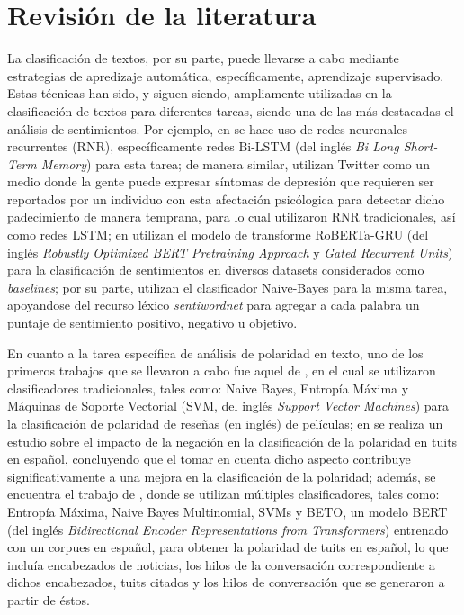 \documentclass[a4paper]{llncs}
\begin{document}
\section{Revisión de la literatura}
\label{sec:org158fde6}
La clasificación de textos, por su parte, puede llevarse a cabo mediante
estrategias de apredizaje automática, específicamente, aprendizaje supervisado.
Estas técnicas han sido, y siguen siendo, ampliamente utilizadas en la
clasificación de textos para diferentes tareas, siendo una de las más destacadas
el análisis de sentimientos. Por ejemplo, en \cite{jaca2023sentiment} se hace uso
de redes neuronales recurrentes (RNR), específicamente redes Bi-LSTM (del inglés
\emph{Bi Long Short-Term Memory}) para esta tarea;  de manera similar,
\cite{depression_detection} utilizan Twitter como un medio donde la gente puede
expresar síntomas de depresión que requieren ser reportados por un individuo con
esta afectación psicólogica para detectar dicho padecimiento de manera temprana,
para lo cual utilizaron RNR tradicionales, así como redes LSTM; en
\cite{roberta_gru} utilizan el modelo de transforme RoBERTa-GRU (del inglés
\emph{Robustly Optimized BERT Pretraining Approach} y \emph{Gated Recurrent Units}) para
la clasificación de sentimientos en diversos datasets considerados como
\emph{baselines}; por su parte, \cite{sentiment_naive_bayes} utilizan el clasificador
Naive-Bayes para la misma tarea, apoyandose del recurso léxico \emph{sentiwordnet}
para agregar a cada palabra un puntaje de sentimiento positivo, negativo u
objetivo.

En cuanto a la tarea específica de análisis de polaridad en texto, uno de los
primeros trabajos que se llevaron a cabo fue aquel de
\cite{pang_sentiment_classification}, en el cual se utilizaron clasificadores
tradicionales, tales como: Naive Bayes, Entropía Máxima y Máquinas de Soporte
Vectorial (SVM, del inglés \emph{Support Vector Machines}) para la clasificación de
polaridad de reseñas (en inglés) de películas; en \cite{scope_of_negation_camara}
se realiza un estudio sobre el impacto de la negación en la clasificación de la
polaridad en tuits en español, concluyendo que el tomar en cuenta dicho aspecto
contribuye significativamente a una mejora en la clasificación de la polaridad;
además, se encuentra el trabajo de \cite{paper_cesar}, donde se utilizan múltiples
clasificadores, tales como: Entropía Máxima, Naive Bayes Multinomial, SVMs y
BETO, un modelo BERT (del inglés \emph{Bidirectional Encoder Representations from
Transformers}) entrenado con un corpues en español, para obtener la polaridad
de tuits en español, lo que incluía encabezados de noticias, los hilos de la
conversación correspondiente a dichos encabezados, tuits citados y los hilos de
conversación que se generaron a partir de éstos.
\end{document}
